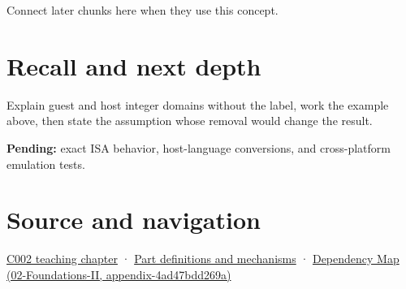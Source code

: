 Connect later chunks here when they use this concept.

\section{Recall and next depth}\label{appendix-33e7a011b684-recall-and-next-depth}

Explain guest and host integer domains without the label, work the example above, then state the assumption whose removal would change the result.

\textbf{Pending:} exact ISA behavior, host-language conversions, and cross-platform emulation tests.

\section{Source and navigation}\label{appendix-33e7a011b684-source-and-navigation}

\href{Continuous\%20Notes/Computing\%20Foundations\%20-\%20From\%20Bits\%20to\%20C++\%20and\%20Systems\%20APIs\#Arithmetic\%20becomes\%20a\%20policy}{C002 teaching chapter} · \hyperref[appendix-fd090d982a15]{Part definitions and mechanisms} · \href{../02-Foundations-II/main.pdf\#nameddest=appendix-4ad47bdd269a}{Dependency Map (02-Foundations-II, appendix-4ad47bdd269a)}
